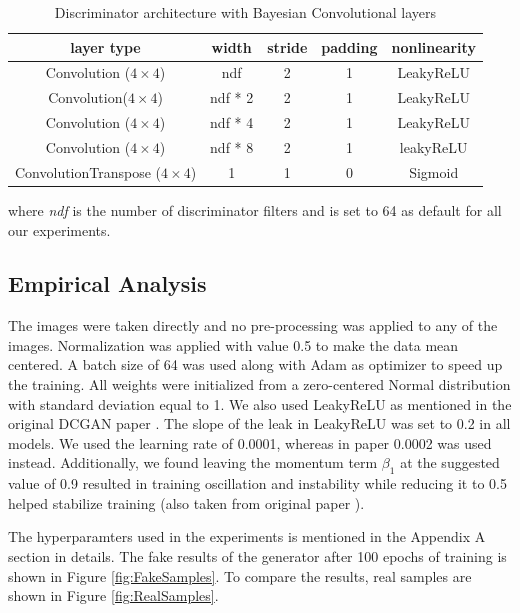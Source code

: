 \begin{table}[H]
    \centering
    \renewcommand{\arraystretch}{2}
    \begin{tabular}{c c c c c} 
 \hline
 layer type & width & stride & padding & nonlinearity \\ [0.5ex] 
 \hline
 Convolution ($4\times4$) & ndf & 2 & 1  & LeakyReLU \\ 
 

 Convolution($4\times4$) & ndf * 2 & 2 & 1  & LeakyReLU \\
 
 
 Convolution ($4\times4$) & ndf * 4 & 2 & 1 & LeakyReLU \\
 
 Convolution ($4\times4$) & ndf * 8 & 2 & 1  & leakyReLU \\
 
 ConvolutionTranspose ($4\times4$) & 1 & 1 & 0 & Sigmoid \\ [1ex] 
 \hline
\end{tabular}
\renewcommand{\arraystretch}{1}
\caption{Discriminator architecture with Bayesian Convolutional layers}
\label{tab:DiscriminatorArchitecture}
\end{table}

where \textit{ndf} is the number of discriminator filters and is set to 64 as default for all our experiments. 

\subsection{Empirical Analysis}

The images were taken directly and no pre-processing was applied to any of the images. Normalization was applied with value 0.5 to make the data mean centered. A batch size of 64 was used along with Adam \citep{kingma2014adam} as optimizer to speed up the training. All weights were initialized from a zero-centered Normal distribution with standard deviation equal to 1. We also used LeakyReLU as mentioned in the original DCGAN paper \cite{DBLP:journals/corr/RadfordMC15}. The slope of the leak in LeakyReLU was set to 0.2 in all models. We used the learning rate of 0.0001, whereas in paper 0.0002 was used instead. Additionally, we found leaving the momentum term $\beta_1$ at the suggested value of 0.9 resulted in training oscillation and instability while reducing it to 0.5 helped stabilize training (also taken from original paper \cite{DBLP:journals/corr/RadfordMC15}).

The hyperparamters used in the experiments is mentioned in the Appendix A section in details.
The fake results of the generator after 100 epochs of training is shown in Figure \ref{fig:FakeSamples}. To compare the results, real samples are shown in Figure \ref{fig:RealSamples}.  

